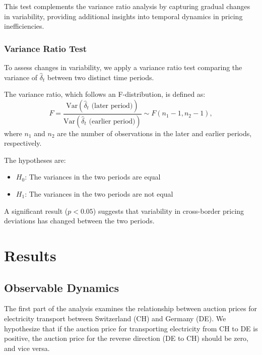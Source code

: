 \documentclass[12pt]{article}
\begin{document}
This test complements the variance ratio analysis by capturing gradual changes in variability, providing additional insights into temporal dynamics in pricing inefficiencies.

\subsubsection*{Variance Ratio Test}
To assess changes in variability, we apply a variance ratio test comparing the variance of $\hat{\delta}_t$ between two distinct time periods. 

The variance ratio, which follows an F-distribution, is defined as:
\begin{equation}
    F = \frac{\text{Var}(\hat{\delta}_t \text{ (later period)})}{\text{Var}(\hat{\delta}_t \text{ (earlier period)})} \sim F(n_1 - 1, n_2 - 1),
\end{equation}
where $n_1$ and $n_2$ are the number of observations in the later and earlier periods, respectively.

The hypotheses are:
\begin{itemize}
    \item $H_0$: The variances in the two periods are equal
    \item $H_1$: The variances in the two periods are not equal
\end{itemize}
A significant result ($p < 0.05$) suggests that variability in cross-border pricing deviations has changed between the two periods.



\section{Results}

\subsection{Observable Dynamics}

The first part of the analysis examines the relationship between auction prices for electricity transport between Switzerland (CH) and Germany (DE). We hypothesize that if the auction price for transporting electricity from CH to DE is positive, the auction price for the reverse direction (DE to CH) should be zero, and vice versa.
\end{document}
